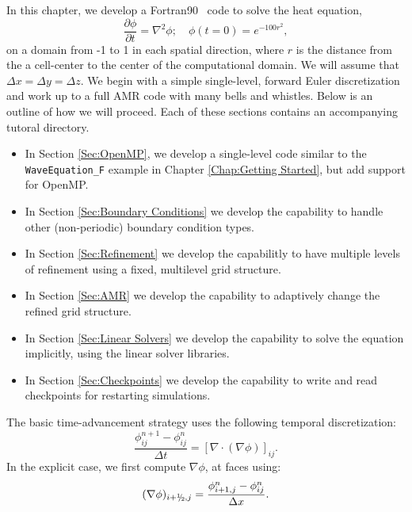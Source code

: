 In this chapter, we develop a Fortran90 \BoxLib\ code to solve the heat equation,
\begin{equation}
\frac{\partial\phi}{\partial t} = \nabla^2 \phi; \quad \phi(t=0) = e^{-100r^2},
\end{equation}
on a domain from -1 to 1 in each spatial direction, where $r$ is the distance
from the a cell-center to the center of the computational domain.  We will
assume that $\Delta x = \Delta y = \Delta z$.  We begin with a simple single-level, 
forward Euler discretization and work up to
a full AMR code with many bells and whistles.  Below is an outline of how we will 
proceed.  Each of these sections contains an accompanying tutoral directory.
\begin{itemize}

\item In Section \ref{Sec:OpenMP}, we develop a single-level code similar to the
{\tt WaveEquation\_F} example in Chapter \ref{Chap:Getting Started}, but add 
support for OpenMP.

\item In Section \ref{Sec:Boundary Conditions} we develop the capability to handle
other (non-periodic) boundary condition types.

\item In Section \ref{Sec:Refinement} we develop the capabilitly to have multiple
levels of refinement using a fixed, multilevel grid structure.

\item In Section \ref{Sec:AMR} we develop the capability to adaptively change the
refined grid structure.

\item In Section \ref{Sec:Linear Solvers} we develop the capability to solve the
equation implicitly, using the linear solver libraries.

\item In Section \ref{Sec:Checkpoints} we develop the capability to write and read
checkpoints for restarting simulations.

\end{itemize}
The basic time-advancement strategy uses the following temporal discretization:
\begin{equation}
\frac{\phi_{ij}^{n+1} - \phi_{ij}^n}{\Delta t} = \left[\nabla\cdot(\nabla\phi)\right]_{ij}.
\end{equation}
In the explicit case, we first compute $\nabla\phi$, at faces using:
\begin{equation}
(\nabla\phi)_{i+\myhalf,j} = \frac{\phi_{i+1,j}^n-\phi_{ij}^n}{\Delta x}.
\end{equation}
